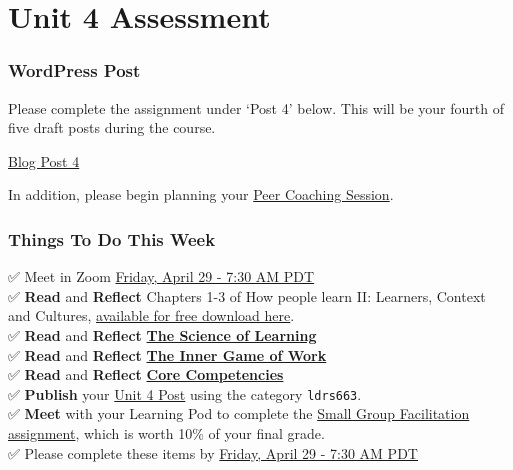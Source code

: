 \documentclass[
]{book}
\begin{document}
\hypertarget{unit-4-assessment}{%
\section*{Unit 4 Assessment}\label{unit-4-assessment}}

\begin{wp}
\hypertarget{wordpress-post-1}{%
\subsubsection{WordPress Post}\label{wordpress-post-1}}

Please complete the assignment under `Post 4' below. This will be your fourth of five draft posts during the course.

\href{https://ma-lead.github.io/ldrs663/assessments.html\#post-4}{Blog Post 4}

In addition, please begin planning your \href{https://ma-lead.github.io/ldrs663/assessments.html\#peer-coaching-session-15}{Peer Coaching Session}.
\end{wp}

\begin{feedback}
\hypertarget{things-to-do-this-week}{%
\subsubsection{Things To Do This Week}\label{things-to-do-this-week}}

✅ Meet in Zoom \href{https://www.timeanddate.com/worldclock/fixedtime.html?msg=LDRS+663+Meeting\&iso=20220429T0730\&p1=1109\&ah=1\&am=30}{Friday, April 29 - 7:30 AM PDT}\\
✅ \textbf{Read} and \textbf{Reflect} Chapters 1-3 of How people learn II: Learners, Context and Cultures, \href{https://www.nap.edu/catalog/24783}{available for free download here}.\\
✅ \textbf{Read} and \textbf{Reflect} \href{https://deansforimpact.org/wp-content/uploads/2016/12/The_Science_of_Learning.pdf}{\textbf{The Science of Learning}}\\
✅ \textbf{Read} and \textbf{Reflect} \href{https://thesystemsthinker.com/the-inner-game-of-work-building-capability-in-the-workplace/}{\textbf{The Inner Game of Work}}\\
✅ \textbf{Read} and \textbf{Reflect} \href{https://coachfederation.org/core-competencies}{\textbf{Core Competencies}}\\
✅ \textbf{Publish} your \href{https://ma-lead.github.io/ldrs663/assessments.html\#post-4}{Unit 4 Post} using the category \texttt{ldrs663}.\\
✅ \textbf{Meet} with your Learning Pod to complete the \href{https://ma-lead.github.io/ldrs663/assessments.html\#small-group-facilitation-10}{Small Group Facilitation assignment}, which is worth 10\% of your final grade.\\
✅ Please complete these items by \href{https://www.timeanddate.com/worldclock/fixedtime.html?msg=LDRS+663+Meeting\&iso=20220429T0730\&p1=1109\&ah=1\&am=30}{Friday, April 29 - 7:30 AM PDT}
\end{feedback}
\end{document}
